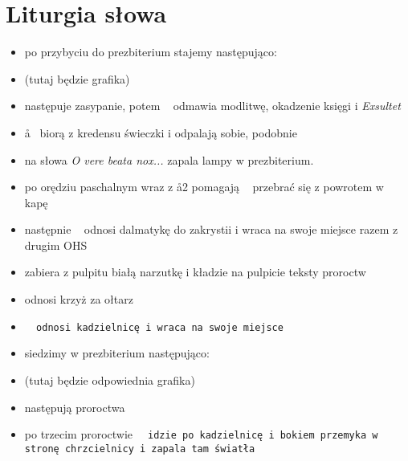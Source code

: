 \section{Liturgia słowa}
	
		\begin{itemize}
			\item po przybyciu do prezbiterium stajemy następująco:
			\item (tutaj będzie grafika)
			\item następuje zasypanie, potem \cc~ odmawia modlitwę, okadzenie księgi i
			\textit{Exsultet} 
			\item \aa~ biorą z kredensu świeczki i odpalają sobie, podobnie 
			\item {} na słowa \textit{O vere beata nox...} zapala lampy w prezbiterium.
			\item po orędziu paschalnym  wraz z \aa2 pomagają \ii~ przebrać się z powrotem w kapę
			\item następnie \cc~ odnosi dalmatykę do zakrystii i wraca na swoje miejsce razem z drugim OHS
			\item {} zabiera z pulpitu białą narzutkę i kładzie na pulpicie teksty proroctw 
			\item {} odnosi krzyż za ołtarz
			\item \tt~ odnosi kadzielnicę i wraca na swoje miejsce
			\item siedzimy w prezbiterium następująco:
			\item (tutaj będzie odpowiednia grafika)
			\item następują proroctwa
			\item po trzecim proroctwie \tt~ idzie po kadzielnicę i bokiem przemyka w stronę chrzcielnicy i zapala tam światła
		\end{itemize}